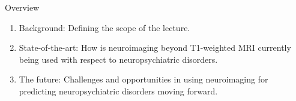 \documentclass[10pt]{beamer}
\subtitle{The role of neuroimaging beyond T1-weighted MRI in the diagnosis and prediction of neuropsychiatric disorders}
\author{Esten H. Leonardsen}
\date{26.10.23}
\begin{document}
	\begin{frame}
	 	\titlepage
	\end{frame}

    \begin{frame}{Overview}
        \begin{enumerate}[label=\theenumi.]
            \item Background: Defining the scope of the lecture.
            \item State-of-the-art: How is neuroimaging beyond T1-weighted MRI currently being used with respect to neuropsychiatric disorders.
            \item The future: Challenges and opportunities in using neuroimaging for predicting neuropsychiatric disorders moving forward.
        \end{enumerate}
    \end{frame}

    \newsavebox{\modalities}

    \newcommand{\stickman}[2]{
        \node[circle,fill,minimum size=2.5mm,#2] (head) at #1 {};
        \node[rounded corners=1pt,minimum height=0.65cm,minimum width=0.2cm,fill,below = 0.5pt of head,#2] (body) {};
        \draw[line width=0.5mm,round cap-round cap,#2] ([shift={(1pt,-0.5pt)}]body.north east) --++(-90:3mm);
        \draw[line width=0.5mm,round cap-round cap,#2] ([shift={(-1pt,-0.5pt)}]body.north west)--++(-90:3mm);
        \draw[thick,white,-round cap] (body.south) --++(90:2.75mm);
    }
\end{document}
